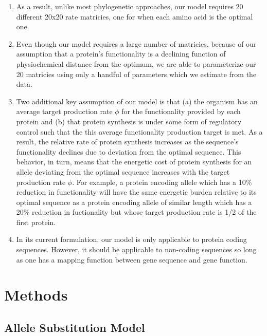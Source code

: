 \documentclass{article}
\begin{document}
\begin{enumerate}
\item As a result, unlike most phylogenetic approaches, our model requires 20 different 20x20 rate matricies, one for when each amino acid is the optimal one.
\item Even though our model requires a large number of matricies, because of our assumption that a protein's functionality is a declining function of physiochemical distance from the optimum, we are able to parameterize our 20 matricies using only a handful of parameters which we estimate from the data.
\item Two additional key assumption of our model is that (a) the organism has an average target production rate $\phi$ for the functionality provided by each protein and (b) that protein synthesis is under some form of  regulatory control such that the this average functionality production target is met.
As a result, the relative rate of protein synthesis increases as the sequence's functionality declines due to deviation from the optimal sequence.
This behavior, in turn, means that the energetic cost of protein synthesis for an allele deviating from the optimal sequence increases with the target production rate $\phi$.
For example, a protein encoding allele which has a 10\% reduction in functionality will have the same energetic burden relative to its optimal sequence as a protein encoding allele of similar length which has a 20\% reduction in fuctionality but whose target production rate is 1/2 of the first protein.
\item In its current formulation, our model is only applicable to protein coding sequences.
However, it should be applicable to non-coding sequences so long as one has a mapping function between gene sequence and gene function.
\end{enumerate}





\section*{Methods}
\subsection*{Allele Substitution Model}
\end{document}
